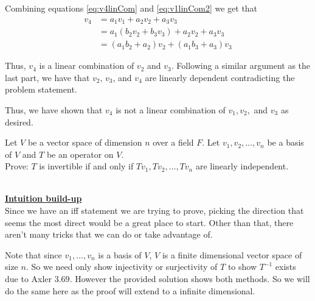 \documentclass[answers]{exam}
\begin{document}
\begin{questions}
\begin{parts}
\begin{subparts}
\begin{solution}
                Combining equations \eqref{eq:v4linCom} and \eqref{eq:v1linCom2} we get that
                \begin{align*}
                    v_4 &= a_1v_1 + a_2v_2 + a_3v_3 \\
                    &= a_1\left(b_2v_2 + b_3v_3\right) + a_2v_2 + a_3v_3 \\
                    &= \left(a_1b_2 + a_2\right)v_2 + \left(a_1b_3 + a_3\right)v_3
                \end{align*}

                Thus, $v_4$ is a linear combination of $v_2$ and $v_3$. Following a similar argument as the last
                part, we have that $v_2$, $v_3$, and $v_4$ are linearly dependent contradicting the problem
                statement. 

                Thus, we have shown that $v_4$ is not a linear combination of $v_1,v_2,$ and $v_3$ as desired.
            \end{solution}
        \end{subparts}
        \iffalse %
        \part Find $10$ vectors in $\R^3$ so that any three of them for a basis. Justify your answer.
        \fi
    \end{parts}
    \question Let $V$ be a vector space of dimension $n$ over a field $F$. Let $v_1,v_2,\dots,v_n$ be a basis of $V$ and $T$ be an operator on $V$. \\
    Prove: $T$ is invertible if and only if $Tv_1,Tv_2,\dots,Tv_n$ are linearly independent.
    \begin{solution}\,\\
        \underline{\textbf{Intuition build-up}}\\
        Since we have an iff statement we are trying to prove, picking the direction that seems the most direct
        would be a great place to start. Other than that, there aren't many tricks that we can do or take advantage of.

        Note that since $v_1,\dots,v_n$ is a basis of $V$, $V$ is a finite dimensional vector space of size $n$.
        So we need only show injectivity or surjectivity of $T$ to show $T^{-1}$ exists due to Axler $3.69$. 
        However the provided solution
        shows both methods. So we will do the same here as the proof will extend to a infinite dimensional.


\end{solution}
\end{questions}
\end{document}
